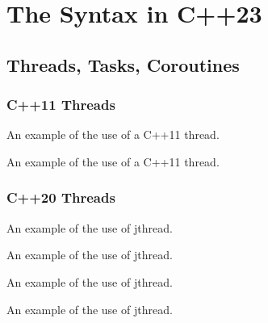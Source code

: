 \chapter{The Syntax in C++23}

\section{Threads, Tasks, Coroutines}

\subsection{C++11 Threads}

\raggedbottom
\begin{codebox}[]{\href{https://godbolt.org/z/}{\ExternalLink}}
\footnotesize An example of the use of a C++11 thread.
\tcblower
{}
\end{codebox}

\raggedbottom
\begin{codebox}[]{\href{https://godbolt.org/z/}{\ExternalLink}}
\footnotesize An example of the use of a C++11 thread.
\tcblower
{}
\end{codebox}

\subsection{C++20 Threads}

\raggedbottom
\begin{codebox}[]{\href{https://godbolt.org/z/}{\ExternalLink}}
\footnotesize An example of the use of jthread.
\tcblower
{}
\end{codebox}

\raggedbottom
\begin{codebox}[]{\href{https://godbolt.org/z/}{\ExternalLink}}
\footnotesize An example of the use of jthread.
\tcblower
{}
\end{codebox}

\raggedbottom
\begin{codebox}[]{\href{https://godbolt.org/z/}{\ExternalLink}}
\footnotesize An example of the use of jthread.
\tcblower
{}
\end{codebox}

\raggedbottom
\begin{codebox}[]{\href{https://godbolt.org/z/}{\ExternalLink}}
\footnotesize An example of the use of jthread.
\tcblower
{}
\end{codebox}

